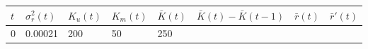 \documentclass[]{book}
\begin{document}
\begin{enumerate}
  \begin{longtable}[]{@{}llllllll@{}}
  \toprule
  \begin{minipage}[b]{0.02\columnwidth}\raggedright
  \(t\)\strut
  \end{minipage} & \begin{minipage}[b]{0.12\columnwidth}\raggedright
  \(\sigma^2_r(t)\)\strut
  \end{minipage} & \begin{minipage}[b]{0.07\columnwidth}\raggedright
  \(K_u(t)\)\strut
  \end{minipage} & \begin{minipage}[b]{0.07\columnwidth}\raggedright
  \(K_m(t)\)\strut
  \end{minipage} & \begin{minipage}[b]{0.10\columnwidth}\raggedright
  \(\bar{K}(t)\)\strut
  \end{minipage} & \begin{minipage}[b]{0.20\columnwidth}\raggedright
  \(\bar{K}(t)-\bar{K}(t-1)\)\strut
  \end{minipage} & \begin{minipage}[b]{0.10\columnwidth}\raggedright
  \(\bar{r}(t)\)\strut
  \end{minipage} & \begin{minipage}[b]{0.11\columnwidth}\raggedright
  \(\bar{r}'(t)\)\strut
  \end{minipage}\tabularnewline
  \midrule
  \endhead
  \begin{minipage}[t]{0.02\columnwidth}\raggedright
  0\strut
  \end{minipage} & \begin{minipage}[t]{0.12\columnwidth}\raggedright
  0.00021\strut
  \end{minipage} & \begin{minipage}[t]{0.07\columnwidth}\raggedright
  200\strut
  \end{minipage} & \begin{minipage}[t]{0.07\columnwidth}\raggedright
  50\strut
  \end{minipage} & \begin{minipage}[t]{0.10\columnwidth}\raggedright
  250\strut
  \end{minipage} & \begin{minipage}[t]{0.20\columnwidth}\raggedright
  \strut
  \end{minipage} & \begin{minipage}[t]{0.10\columnwidth}\raggedright
  \strut
  \end{minipage} & \begin{minipage}[t]{0.11\columnwidth}\raggedright

\end{minipage}
\end{longtable}
\end{enumerate}
\end{document}
